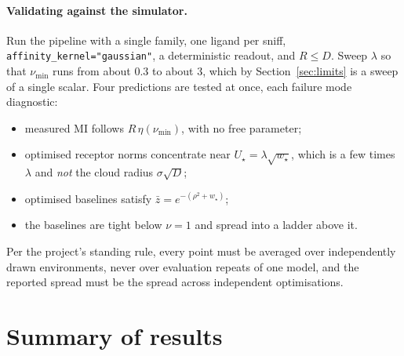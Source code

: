 \documentclass[11pt,a4paper]{article}
\begin{document}
\paragraph{Validating against the simulator.} Run the pipeline with a single family, one
ligand per sniff, \texttt{affinity\_kernel="gaussian"}, a deterministic readout, and
$R\le D$. Sweep $\lambda$ so that $\nu_{\min}$ runs from about $0.3$ to about $3$, which
by Section~\ref{sec:limits} is a sweep of a single scalar. Four predictions are tested
at once, each failure mode diagnostic:
\begin{itemize}
  \item measured MI follows $R\,\eta(\nu_{\min})$, with no free parameter;
  \item optimised receptor norms concentrate near
        $U_\star=\lambda\sqrt{w_\star}$, which is a few times $\lambda$ and \emph{not}
        the cloud radius $\sigma\sqrt D$;
  \item optimised baselines satisfy $\bar z=e^{-(\rho^2+w_\star)}$;
  \item the baselines are tight below $\nu=1$ and spread into a ladder above it.
\end{itemize}
Per the project's standing rule, every point must be averaged over independently drawn
environments, never over evaluation repeats of one model, and the reported spread must
be the spread across independent optimisations.

\section{Summary of results}
\end{document}
